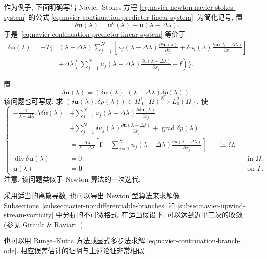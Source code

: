 作为例子, 下面明确写出 Navier--Stokes 方程
\eqref{eq:navier-newton-navier-stokes-system} 的公式
\eqref{eq:navier-continuation-predictor-linear-system}. 为简化记号, 置
\[
\delta\boldsymbol u(\lambda)=
\boldsymbol u^0(\lambda)-\boldsymbol u(\lambda-\Delta\lambda).
\]
于是 \,\eqref{eq:navier-continuation-predictor-linear-system} 等价于
\[
\begin{aligned}
\delta\boldsymbol u(\lambda)=-T\Bigg\{&
(\lambda-\Delta\lambda)\sum_{j=1}^N
\left[u_j(\lambda-\Delta\lambda)
\frac{\partial\delta\boldsymbol u(\lambda)}{\partial x_j}
+\delta u_j(\lambda)
\frac{\partial\boldsymbol u(\lambda-\Delta\lambda)}{\partial x_j}\right]\\
&+\Delta\lambda\left(
\sum_{j=1}^Nu_j(\lambda-\Delta\lambda)
\frac{\partial\boldsymbol u(\lambda-\Delta\lambda)}{\partial x_j}
-\boldsymbol f\right)\Bigg\}.
\end{aligned}
\]

置
\[
\delta\mathbf u(\lambda)=
(\delta\boldsymbol u(\lambda),(\lambda-\Delta\lambda)\delta p(\lambda)),
\]
该问题也可写成: 求
$(\delta\boldsymbol u(\lambda),\delta p(\lambda))
\in H_0^1(\Omega)^N\times L_0^2(\Omega)$, 使
\[
\left\{
\begin{aligned}
-\frac1{\lambda-\Delta\lambda}\Delta\delta\boldsymbol u(\lambda)
&+\sum_{j=1}^N u_j(\lambda-\Delta\lambda)
\frac{\partial\delta\boldsymbol u(\lambda)}{\partial x_j}\\
&+\sum_{j=1}^N\delta u_j(\lambda)
\frac{\partial\boldsymbol u(\lambda-\Delta\lambda)}{\partial x_j}
+\operatorname{grad}\delta p(\lambda)\\
&=\frac{\Delta\lambda}{\lambda-\Delta\lambda}
\left[\boldsymbol f-\sum_{j=1}^Nu_j(\lambda-\Delta\lambda)
\frac{\partial\boldsymbol u(\lambda-\Delta\lambda)}{\partial x_j}\right]
\qquad\text{in }\Omega,\\
\operatorname{div}\delta\boldsymbol u(\lambda)&=0&&\text{in }\Omega,\\
\boldsymbol u(\lambda)&=\boldsymbol0&&\text{on }\Gamma.
\end{aligned}
\right.
\]
注意, 该问题类似于 Newton 算法的一次迭代.

\setcounter{statement}{0}
\begin{Remark}
\label{rem:navier-discrete-newton-nondifferentiable}
采用适当的离散导数, 也可以导出 Newton 型算法来求解像
Subsections~\ref{subsec:navier-nondifferentiable-branches} 和
\ref{subsec:navier-upwind-stream-vorticity} 中分析的不可微格式. 在适当假设下,
可以达到近乎二次的收敛(参见 Girault \& Raviart~\cite{GiraultRaviart34}).
\end{Remark}

\setcounter{statement}{1}
\begin{Remark}
\label{rem:navier-continuation-higher-order-integrators}
也可以用 Runge--Kutta 方法或显式多步法求解
\eqref{eq:navier-continuation-branch-ode}. 相应误差估计的证明与上述论证非常相似.
\end{Remark}
